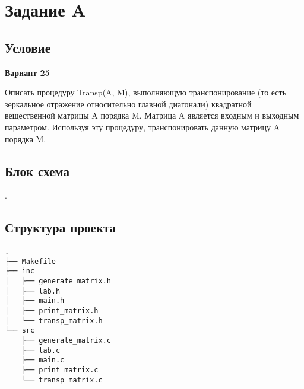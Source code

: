 \documentclass[12pt, a4paper]{article}
\begin{document}
\maketitle
\setcounter{page}{2}

\renewcommand{\contentsname}{Содержание}
\tableofcontents
\newpage

\labheading


\labreport

\section{Задание A}

\subsection{Условие}

\begin{center}
    \textbf{Вариант 25}
\end{center}

Описать процедуру Transp(A, M), выполняющую транспонирование (то есть зеркальное отражение относительно главной диагонали) квадратной вещественной матрицы A порядка M. Матрица A является входным и выходным параметром. Используя эту процедуру, транспонировать данную матрицу A порядка M.

\subsection{Блок схема}

.

\subsection{Структура проекта}

\begin{verbatim}
.
├── Makefile
├── inc
│   ├── generate_matrix.h
│   ├── lab.h
│   ├── main.h
│   ├── print_matrix.h
│   └── transp_matrix.h
└── src
    ├── generate_matrix.c
    ├── lab.c
    ├── main.c
    ├── print_matrix.c
    └── transp_matrix.c
\end{verbatim}
\end{document}
